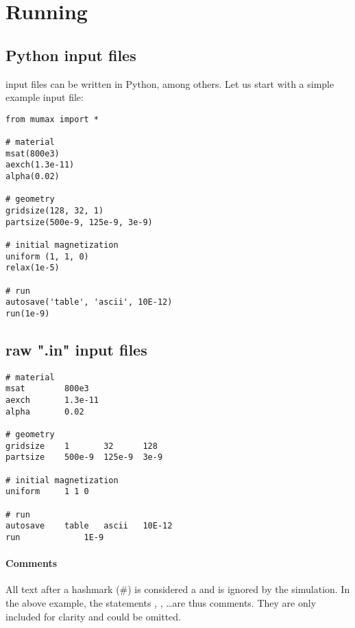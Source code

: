 \section{Running \mumax}


\subsection{Python input files}

\mumax input files can be written in Python, among others. Let us start with a simple example input file: 

\begin{verbatim}
from mumax import *

# material
msat(800e3)
aexch(1.3e-11)
alpha(0.02)

# geometry 
gridsize(128, 32, 1)
partsize(500e-9, 125e-9, 3e-9)

# initial magnetization
uniform	(1, 1, 0)
relax(1e-5)

# run
autosave('table', 'ascii', 10E-12)
run(1e-9)
\end{verbatim}


\subsection{raw ".in" input files}


\begin{verbatim}
# material
msat       	800e3 
aexch      	1.3e-11
alpha      	0.02

# geometry 
gridsize	1     	32      128    
partsize	500e-9	125e-9 	3e-9

# initial magnetization
uniform		1 1 0

# run
autosave	table	ascii	10E-12
run          	1E-9
\end{verbatim}

\newcommand{\defcommand}[2][\space]{\textbf{#2}\index{#2}\label{#2} \textit{#1}}
\newcommand{\command}[1]{\hyperref[#1]{\textbf{#1}}\index{#1}\label{#1}}

\paragraph{Comments} All text after a hashmark (\#) is considered a  and is ignored by the simulation. In the above example, the statements , , \ldots are thus comments. They are only included for clarity and could be omitted.

